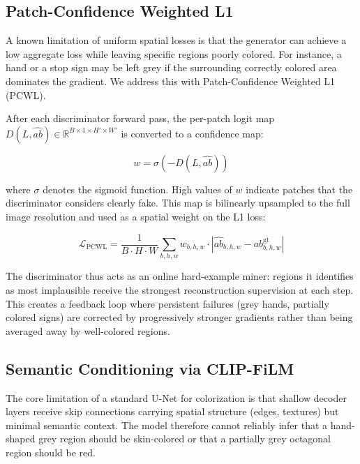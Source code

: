 \documentclass[12pt, a4paper, oneside]{report}
\begin{document}
    \subsection{Patch-Confidence Weighted L1}
    \label{sec:pcwl}

    A known limitation of uniform spatial losses is that the generator can achieve a
    low aggregate loss while leaving specific regions poorly colored. For instance,
    a hand or a stop sign may be left grey if the surrounding correctly colored area
    dominates the gradient. We address this with Patch-Confidence Weighted L1 (PCWL).

    After each discriminator forward pass, the per-patch logit map
    $D(L, \hat{ab}) \in \mathbb{R}^{B \times 1 \times H' \times W'}$ is converted
    to a confidence map:

    \begin{equation}
        w = \sigma(-D(L, \hat{ab}))
    \end{equation}

    where $\sigma$ denotes the sigmoid function. High values of $w$ indicate patches
    that the discriminator considers clearly fake. This map is bilinearly upsampled
    to the full image resolution and used as a spatial weight on the L1 loss:

    \begin{equation}
        \mathcal{L}_{\text{PCWL}} =
        \frac{1}{B \cdot H \cdot W}
        \sum_{b,h,w} w_{b,h,w} \cdot |\hat{ab}_{b,h,w} - ab^{\text{gt}}_{b,h,w}|
    \end{equation}

    The discriminator thus acts as an online hard-example miner: regions it identifies
    as most implausible receive the strongest reconstruction supervision at each step.
    This creates a feedback loop where persistent failures (grey hands, partially
    colored signs) are corrected by progressively stronger gradients rather than being
    averaged away by well-colored regions.

    \subsection{Semantic Conditioning via CLIP-FiLM}
    \label{sec:clipfilm}

    The core limitation of a standard U-Net for colorization is that shallow decoder
    layers receive skip connections carrying spatial structure (edges, textures) but
    minimal semantic context. The model therefore cannot reliably infer that a
    hand-shaped grey region should be skin-colored or that a partially grey octagonal
    region should be red.
\end{document}
